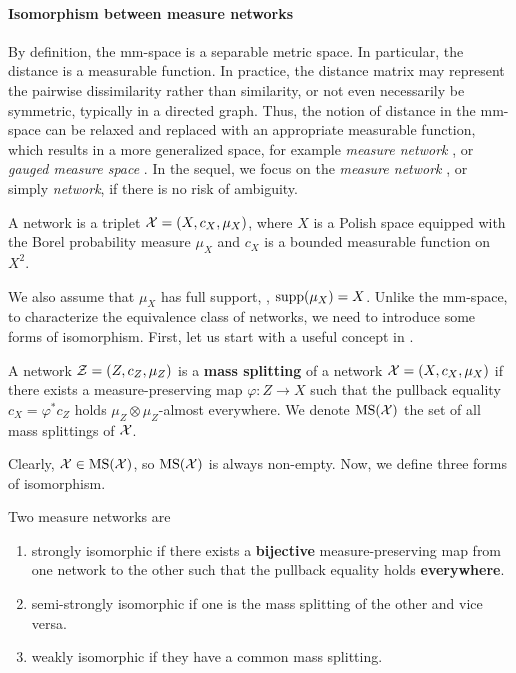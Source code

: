 \paragraph{Isomorphism between measure networks}
By definition, the mm-space is a separable metric space. In particular, the distance is
a measurable function. In practice, the distance matrix may represent the
pairwise dissimilarity rather than similarity, or not even necessarily be symmetric,
typically in a directed graph.
Thus, the notion of distance in the mm-space can be relaxed and replaced
with an appropriate measurable function, which results in a more generalized space, for example
\textit{measure network} \citep{Chowdhury19}, or \textit{gauged measure space} \citep{Sturm12}.
In the sequel, we focus on the \textit{measure network} \citep{Chowdhury19},
or simply \textit{network}, if there is no risk of ambiguity.
\begin{definition}
  A network is a triplet $\mathcal X = (X, c_X, \mu_X)$,
  where $X$ is a Polish space equipped with the Borel probability
  measure $\mu_X$ and $c_X$ is a bounded measurable function on $X^2$.
\end{definition}
We also assume that $\mu_X$ has full support, \ie, $\text{supp}(\mu_X) = X$.
Unlike the mm-space, to characterize the equivalence class of networks, we need to introduce
some forms of isomorphism. First, let us start with a useful concept in \citep{Memoli21}.
\begin{definition}
  A network $\mathcal Z = (Z, c_Z, \mu_Z)$ is a \textbf{mass splitting}
  of a network $\mathcal X = (X, c_X, \mu_X)$ if there exists
  a measure-preserving map $\varphi: Z \to X$ such that the pullback equality
  $c_X = \varphi^*c_Z$ holds $\mu_Z \otimes \mu_Z$-almost everywhere.
  We denote $\text{MS}(\mathcal X)$ the set of all mass splittings of $\mathcal X$.
\end{definition}
Clearly, $\mathcal X \in \text{MS}(\mathcal X)$, so $\text{MS}(\mathcal X)$ is always non-empty. Now, we define three forms of
isomorphism.
\begin{definition}[Isomorphism] \label{def:isomorphic}
  Two measure networks are
  \begin{enumerate}
    \item strongly isomorphic if there exists a \textbf{bijective}
    measure-preserving map from one network to the other such that the pullback equality holds
    \textbf{everywhere}.
    \item semi-strongly isomorphic if one is the mass splitting of the other and vice versa.
    \item weakly isomorphic if they have a common mass splitting.
  \end{enumerate}
\end{definition}

